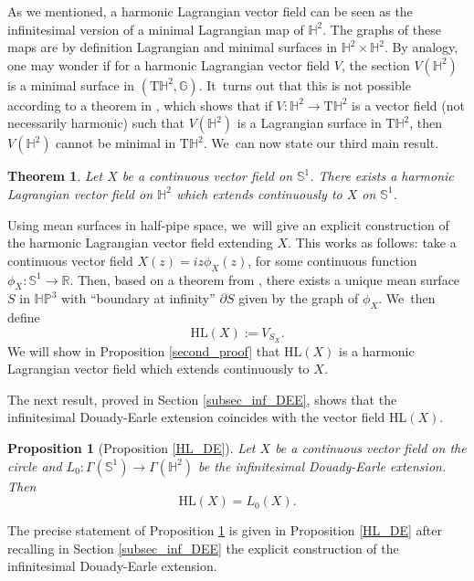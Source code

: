 \documentclass[11pt]{article}
\theoremstyle{plain}
\newtheorem{theorem}[cor]{Theorem}
\newtheorem{prop}[cor]{Proposition}
\theoremstyle{definition}
\newcommand{\HP}{\mathbb{HP}^3}
\begin{document}
As we mentioned, a harmonic Lagrangian vector field can be seen as the infinitesimal version of a minimal Lagrangian map of \(\mathbb{H}^2\). The graphs of these maps are by definition Lagrangian and minimal surfaces in \(\mathbb{H}^2 \times \mathbb{H}^2\). By analogy, one may wonder if for a harmonic Lagrangian vector field \(V\), the section \(V(\mathbb{H}^2)\) is a minimal surface in \((\mathrm{T}\mathbb{H}^2, \mathbb{G})\). It~turns out that this is not possible according to a theorem in \cite[Prop.\,2.2]{ML_in_tangent_bundle}, which shows that if \(V: \mathbb{H}^2 \to \mathrm{T}\mathbb{H}^2\) is a vector field (not necessarily harmonic) such that \(V(\mathbb{H}^2)\) is a Lagrangian surface in \(\mathrm{T}\mathbb{H}^2\), then \(V(\mathbb{H}^2)\) cannot be minimal in \(\mathrm{T}\mathbb{H}^2\). We~can now state our third main result.
\begin{theorem}\label{intro_ex_HL}
Let \(X\) be a continuous vector field on \(\mathbb{S}^1\). There exists a harmonic Lagrangian vector field on \(\mathbb{H}^2\) which extends continuously to \(X\) on \(\mathbb{S}^1\).
\end{theorem}
Using mean surfaces in half-pipe space, we~will give an explicit construction of the harmonic Lagrangian vector field extending \(X\). This works as follows: take a continuous vector field \(X(z) = iz\phi_X(z)\), for some continuous function \(\phi_X: \mathbb{S}^1 \to \mathbb{R}\). Then, based on a theorem from \cite{barbotfillastre}, there exists a unique mean surface \(S\) in \(\HP\) with ``boundary at infinity'' \(\partial S\) given by the graph of \(\phi_X\). We~then define
\begin{equation}\label{intro_HL}
\mathrm{HL}(X) := V_{S_X}.
\end{equation}
We will show in Proposition \ref{second_proof} that \(\mathrm{HL}(X)\) is a harmonic Lagrangian vector field which extends continuously to \(X\).

The next result, proved in Section \ref{subsec_inf_DEE}, shows that the infinitesimal Douady-Earle extension coincides with the vector field \(\mathrm{HL}(X)\).

\begin{prop}[Proposition \ref{HL_DE}]\label{intro_pro_DE}
Let \(X\) be a continuous vector field on the circle and \(L_0: \Gamma(\mathbb{S}^1) \to \Gamma(\mathbb{H}^2)\) be the infinitesimal Douady-Earle extension. Then
\[
\mathrm{HL}(X) = L_0(X).
\]
\end{prop}
The precise statement of Proposition \ref{intro_pro_DE} is given in Proposition \ref{HL_DE} after recalling in Section \ref{subsec_inf_DEE} the explicit construction of the infinitesimal Douady-Earle extension.
\end{document}
